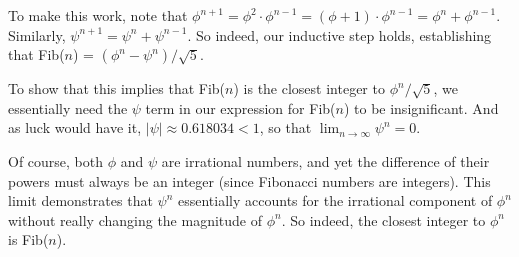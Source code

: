 \documentclass[10pt,letter]{article}
\begin{document}
To make this work, note that $\phi^{n+1} = \phi^2 \cdot \phi^{n-1} = (\phi + 1) \cdot \phi^{n-1} = \phi^n + \phi^{n-1}$. Similarly, $\psi^{n+1} = \psi^n + \psi^{n-1}$. So indeed, our inductive step holds, establishing that Fib($n$) = $(\phi^{n} - \psi^{n})/\sqrt{5}$.

To show that this implies that Fib($n$) is the closest integer to $\phi^n / \sqrt{5}$, we essentially need the $\psi$ term in our expression for Fib($n$) to be insignificant. And as luck would have it, $|\psi| \approx 0.618034 < 1$, so that $\lim_{n \to \infty} \psi^n = 0$.

Of course, both $\phi$ and $\psi$ are irrational numbers, and yet the difference of their powers must always be an integer (since Fibonacci numbers are integers). This limit demonstrates that $\psi^n$ essentially accounts for the irrational component of $\phi^n$ without really changing the magnitude of $\phi^n$. So indeed, the closest integer to $\phi^n$ is Fib($n$).
\end{document}
